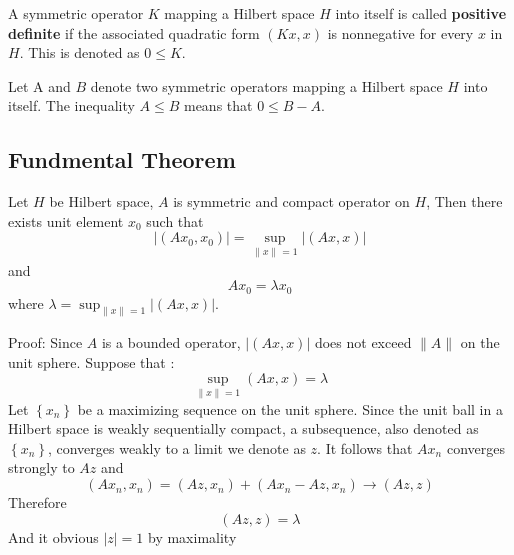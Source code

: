 \documentclass[12pt, oneside]{book}
\begin{document}
\begin{definition}
    A symmetric operator ${K}$ mapping a Hilbert space $H$ into itself is called \textbf{positive definite} if the associated quadratic form $({K} x, x)$ is nonnegative for every $x$ in $H$.
    This is denoted as $0 \leq {K}$.

    Let A and ${B}$ denote two symmetric operators mapping a Hilbert space $H$ into itself. The inequality ${A} \leq {B}$ means that $0 \leq {B}-{A}$.
\end{definition}



\subsection{Fundmental Theorem}
\begin{theorem}
    Let $H$ be Hilbert space, $A$ is symmetric and compact operator on $H$, Then there exists unit element $x_0$ such that
    \begin{equation*}
        \left|\left(A x_0,x_0\right)\right|
        =
        \sup_{\left\| x \right\|_{}=1} \left|\left(Ax,x\right)\right|
    \end{equation*}
    and
    \begin{equation*}
        Ax_0 =\lambda x_0
    \end{equation*}
    where $\lambda = \sup_{\left\| x \right\|_{}=1} \left|\left(Ax,x\right)\right|$.

    Proof:
    Since ${A}$ is a bounded operator,  $\left|({A} x, x)\right|$ does not exceed $\|{A}\|$ on the unit sphere. Suppose that :
    \begin{equation*}
        \sup _{\|x\|=1}({A} x, x)=\lambda
    \end{equation*}
    Let $\left\{x_n\right\}$ be a maximizing sequence on the unit sphere. Since the unit ball in a Hilbert space is weakly sequentially compact, a subsequence, also denoted as $\left\{x_n\right\}$, converges weakly to a limit we denote as $z$.
    It follows that ${A} x_n$ converges strongly to ${A} z$ and
    \begin{equation*}
        \left({A} x_n, x_n\right)
        =
        \left(Az ,x_n\right) +\left(Ax_n-Az ,x_n\right)
        \to
        ({A} z, z)
    \end{equation*}
    Therefore
    \begin{equation*}
        ({A} z, z)=\lambda
    \end{equation*}
    And it obvious $\left|z\right| = 1$ by maximality


\end{theorem}
\end{document}
